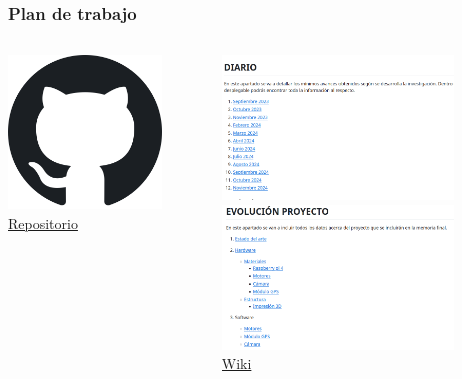 \documentclass{beamer}
\begin{document}
\begin{frame}
	\frametitle{Plan de trabajo}
	\begin{columns}
		\begin{column}{0.40\textwidth}
			\centering
			\includegraphics[width=0.8\textwidth]{figs/github.png} \\[5pt]
			\href{https://github.com/RoboticsURJC/tfg-jlopez}{Repositorio}
		\end{column}
		 \begin{column}{0.5\textwidth}
			\centering
			\includegraphics[width=0.8\textwidth]{figs/diario.png} \\[5pt]
			\includegraphics[width=0.8\textwidth]{figs/evo.png} \\[5pt]
			\href{https://github.com/RoboticsURJC/tfg-jlopez/wiki}{Wiki}
		\end{column}
	\end{columns}
\end{frame}
\end{document}
